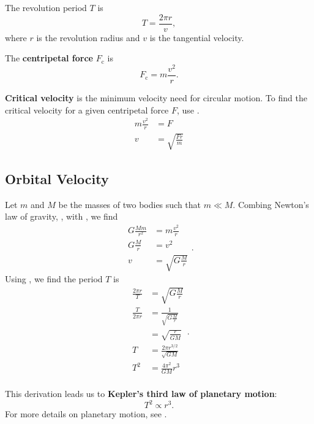 The revolution period \(T\) is
\begin{equation} \label{eq:revolution-period}
    T = \frac{2 \pi r}{v},
\end{equation}
where \(r\) is the revolution radius and \(v\) is the tangential velocity.

The \textbf{centripetal force} \(F_\mathrm{c}\) is
\begin{equation} \label{eq:centripetal-force}
    F_\mathrm{c} = m \frac{v^2}{r}.
\end{equation}

\textbf{Critical velocity} is the minimum velocity need for circular motion.
To find the critical velocity for a given centripetal force \(F\),
use .
\begin{equation}
    \begin{aligned}
        m \frac{v^2}{r} &= F \\
        v &= \sqrt{\frac{F r}{m}}
    \end{aligned}
\end{equation}

\subsection{Orbital Velocity} \label{subsec:orbital-velocity}

Let \(m\) and \(M\) be the masses of two bodies such that \(m \ll M\).
Combing Newton's law of gravity,
,
with , we find
\begin{equation}
    \begin{aligned}
        G \frac{M m}{r^2} &= m \frac{v^2}{r} \\
        G \frac{M}{r} &= v^2 \\
        v &= \sqrt{G \frac{M}{r}}
    \end{aligned}.
\end{equation}
Using , we find the period \(T\) is
\begin{equation}
    \begin{aligned}
        \frac{2 \pi r}{T} &= \sqrt{G \frac{M}{r}} \\
        \frac{T}{2 \pi r} &= \frac{1}{\sqrt{G \frac{M}{r}}} \\
        &= \sqrt{\frac{r}{G M}} \\
        T &= \frac{2 \pi r^{3/2}}{\sqrt{G M}} \\
        T^2 &= \frac{4 \pi^2}{G M} r^3 \\
    \end{aligned}.
\end{equation}

This derivation leads us to \textbf{Kepler's third law of planetary motion}:
\begin{equation} \label{eq:kepler-3rd-law}
    T^2 \propto r^3.
\end{equation}
For more details on planetary motion, see .
